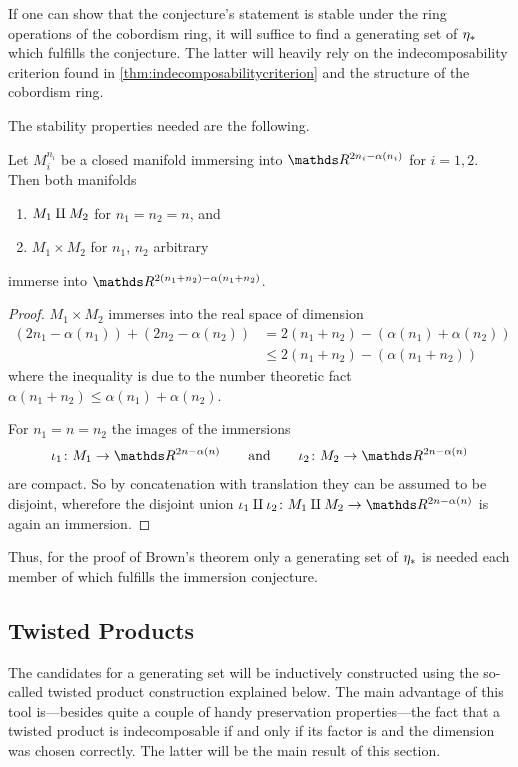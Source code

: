 If one can show that the conjecture's statement is stable
under the ring operations of the cobordism ring, it will suffice to
find a generating set of $\eta_*$ which fulfills the conjecture.
The latter will heavily rely on the indecomposability criterion found
in \autoref{thm:indecomposabilitycriterion} and the structure of the
cobordism ring.

The stability properties needed are the following.
\begin{Lem}
  Let $M_i^{n_i}$ be a closed manifold immersing into
  $\R^{2n_i-\alpha(n_i)}$ for $i=1,2$.
  Then both manifolds
  \begin{enumerate}
  \item $M_1\amalg M_2$ for $n_1=n_2=n$, and
  \item $M_1\times M_2$ for $n_1$, $n_2$ arbitrary
  \end{enumerate}
  immerse into $\R^{2(n_1+n_2)-\alpha(n_1+n_2)}$.
  \begin{proof}
    $M_1\times M_2$ immerses into the real space of dimension
    \begin{align*}
      \left( 2n_1-\alpha(n_1) \right)
      + \left( 2n_2-\alpha(n_2) \right)
      &= 2(n_1+n_2) - \left(\alpha(n_1)+\alpha(n_2)\right)\\
      &\leq 2(n_1+n_2) - \left(\alpha(n_1 + n_2)\right)
    \end{align*}
    where the inequality is due to the number theoretic fact
    $\alpha(n_1+n_2) \leq \alpha(n_1)+\alpha(n_2)$.

    For $n_1=n=n_2$ the images of the immersions
    \begin{gather*}
      \iota_1\colon M_1\to\R^{2n-\alpha(n)}
      \qquad \text{and} \qquad
      \iota_2\colon M_2\to\R^{2n-\alpha(n)}
    \end{gather*}
    are compact. So by
    concatenation with translation they can be assumed to be disjoint,
    wherefore the disjoint union
    $\iota_1\disjointsum\iota_2\colon M_1\disjointsum M_2\to\R^{2n-\alpha(n)}$
    is again an immersion.
  \end{proof}
\end{Lem}

Thus, for the proof of Brown's theorem only a generating set of $\eta_*$
is needed each member of which fulfills the immersion conjecture.

\subsection{Twisted Products}
The candidates for a generating set will be inductively constructed
using the so-called twisted product construction explained below.
The main advantage of this tool is---besides quite a couple of handy
preservation properties---the fact that a twisted product is
indecomposable if and only if its factor is and the dimension was
chosen correctly. The latter will be the main result of this section.

